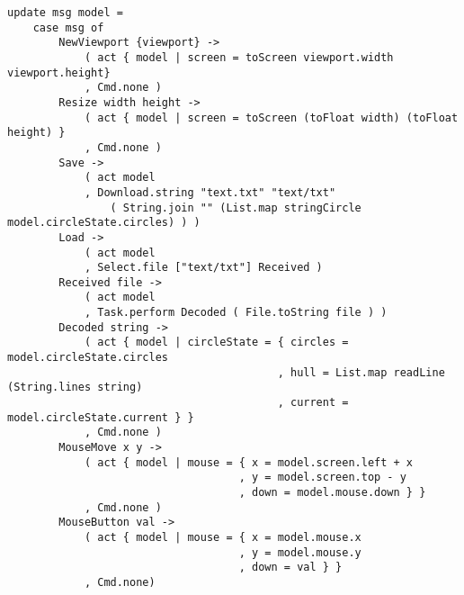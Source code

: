 \documentclass[12pt]{article}
\begin{document}
\begin{itemize}
  \begin{verbatim}
update msg model =
    case msg of
        NewViewport {viewport} ->
            ( act { model | screen = toScreen viewport.width viewport.height}
            , Cmd.none )
        Resize width height ->
            ( act { model | screen = toScreen (toFloat width) (toFloat height) }
            , Cmd.none )
        Save ->
            ( act model
            , Download.string "text.txt" "text/txt"
                ( String.join "" (List.map stringCircle model.circleState.circles) ) )
        Load ->
            ( act model
            , Select.file ["text/txt"] Received )
        Received file ->
            ( act model
            , Task.perform Decoded ( File.toString file ) )
        Decoded string ->
            ( act { model | circleState = { circles = model.circleState.circles
                                          , hull = List.map readLine (String.lines string)
                                          , current = model.circleState.current } }
            , Cmd.none )
        MouseMove x y ->
            ( act { model | mouse = { x = model.screen.left + x
                                    , y = model.screen.top - y
                                    , down = model.mouse.down } }
            , Cmd.none )
        MouseButton val ->
            ( act { model | mouse = { x = model.mouse.x
                                    , y = model.mouse.y
                                    , down = val } }
            , Cmd.none)
  \end{verbatim}


\end{itemize}
\end{document}
